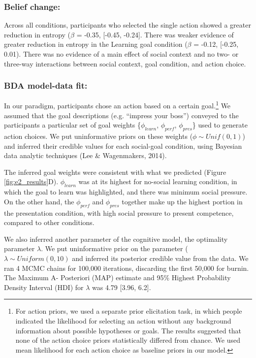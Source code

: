 \documentclass[10pt, letterpaper]{article}
\begin{document}
\subsubsection{Belief change:}\label{belief-change-1}

Across all conditions, participants who selected the single action
showed a greater reduction in entropy (\(\beta\) = -0.35, {[}-0.45,
-0.24{]}. There was weaker evidence of greater reduction in entropy in
the Learning goal condition (\(\beta\) = -0.12, {[}-0.25, 0.01). There
was no evidence of a main effect of social context and no two- or
three-way interactions between social context, goal condition, and
action choice.

\subsubsection{BDA model-data fit:}\label{bda-model-data-fit}

In our paradigm, participants chose an action based on a certain
goal.\footnote{For action priors, we used a separate prior elicitation task, in which people indicated the likelihood for selecting an action without any background information about possible hypotheses or goals. The results suggested that none of the action choice priors statistically differed from chance. We used mean likelihood for each action choice as baseline priors in our model.}
We assumed that the goal descriptions (e.g. ``impress your boss'')
conveyed to the participants a particular set of goal weights
\{\(\phi_{learn}\), \(\phi_{perf}\), \(\phi_{pres}\)\} used to generate
action choices. We put uninformative priors on these weights
(\(\phi \sim Unif(0,1)\)) and inferred their credible values for each
social-goal condition, using Bayesian data analytic techniques (Lee \&
Wagenmakers, 2014).

The inferred goal weights were consistent with what we predicted (Figure
\ref{fig:e2_results}D). \(\phi_{learn}\) was at its highest for
no-social learning condition, in which the goal to learn was
highlighted, and there was minimum social pressure. On the other hand,
the \(\phi_{perf}\) and \(\phi_{pres}\) together make up the highest
portion in the presentation condition, with high social pressure to
present competence, compared to other conditions.

We also inferred another parameter of the cognitive model, the
optimality parameter \(\lambda\). We put uninformative prior on the
parameter (\(\lambda \sim Uniform(0,10)\) and inferred its posterior
credible value from the data. We ran 4 MCMC chains for 100,000
iterations, discarding the first 50,000 for burnin. The Maximum A-
Posteriori (MAP) estimate and 95\% Highest Probability Density Interval
(HDI) for \(\lambda\) was 4.79 {[}3.96, 6.2{]}.
\end{document}
